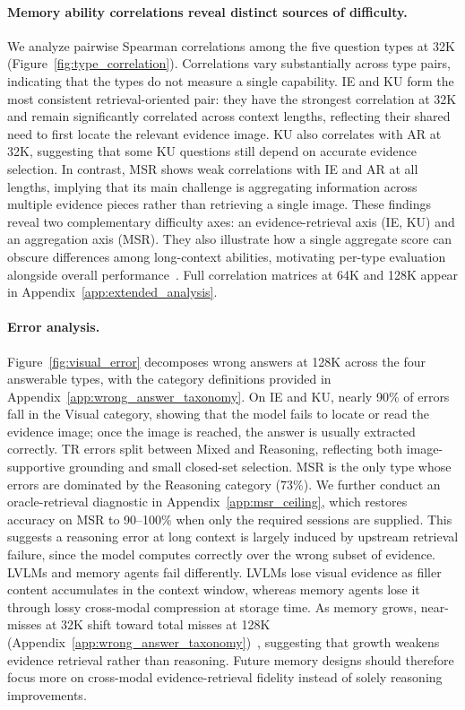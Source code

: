 \documentclass{llmxive}
\begin{document}
\paragraph{Memory ability correlations reveal distinct sources of difficulty.}
We analyze pairwise Spearman correlations among the five question types at 32K (Figure~\ref{fig:type_correlation}). Correlations vary substantially across type pairs, indicating that the types do not measure a single capability. IE and KU form the most consistent retrieval-oriented pair: they have the strongest correlation at 32K and remain significantly correlated across context lengths, reflecting their shared need to first locate the relevant evidence image. KU also correlates with AR at 32K, suggesting that some KU questions still depend on accurate evidence selection. In contrast, MSR shows weak correlations with IE and AR at all lengths, implying that its main challenge is aggregating information across multiple evidence pieces rather than retrieving a single image. These findings reveal two complementary difficulty axes: an evidence-retrieval axis (IE, KU) and an aggregation axis (MSR). They also illustrate how a single aggregate score can obscure differences among long-context abilities, motivating per-type evaluation alongside overall performance~\cite{hsiehruler,yen2024helmet}. Full correlation matrices at 64K and 128K appear in Appendix~\ref{app:extended_analysis}.

\paragraph{Error analysis.}
Figure~\ref{fig:visual_error} decomposes wrong answers at 128K across the four answerable types, with the category definitions provided in Appendix~\ref{app:wrong_answer_taxonomy}. On IE and KU, nearly 90\% of errors fall in the Visual category, showing that the model fails to locate or read the evidence image; once the image is reached, the answer is usually extracted correctly. TR errors split between Mixed and Reasoning, reflecting both image-supportive grounding and small closed-set selection. MSR is the only type whose errors are dominated by the Reasoning category (73\%). We further conduct an oracle-retrieval diagnostic in Appendix~\ref{app:msr_ceiling}, which restores accuracy on MSR to 90--100\% when only the required sessions are supplied. This suggests a reasoning error at long context is largely induced by upstream retrieval failure, since the model computes correctly over the wrong subset of evidence. LVLMs and memory agents fail differently. LVLMs lose visual evidence as filler content accumulates in the context window, whereas memory agents lose it through lossy cross-modal compression at storage time. As memory grows, near-misses at 32K shift toward total misses at 128K (Appendix~\ref{app:wrong_answer_taxonomy})~\cite{levy2024same}, suggesting that growth weakens evidence retrieval rather than reasoning. Future memory designs should therefore focus more on cross-modal evidence-retrieval fidelity instead of solely reasoning improvements.
\end{document}
